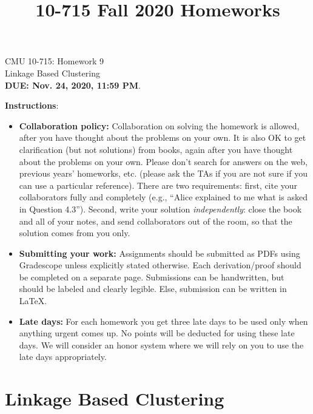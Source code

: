 \documentclass{article}
\title{10-715 Fall 2020 Homeworks}
\begin{document}

\begin{center}
{\Large CMU 10-715: Homework 9}\\
Linkage Based Clustering \\
{\bf DUE: Nov. 24, 2020, 11:59 PM}.\\
\end{center}


\textbf{\large Instructions}:
\begin{itemize}
    \item \textbf{Collaboration policy:} Collaboration on solving the homework is allowed, after you have thought about the problems on your own. It is also OK to get clarification (but not solutions) from books, again after you have thought about the problems on your own. Please don’t search for answers on the web, previous years’ homeworks, etc. (please ask the TAs if you are not sure if you can use a particular reference). There are two requirements: first, cite your collaborators fully and completely (e.g., ``Alice explained to me what is asked in Question 4.3''). Second, write your solution \emph{independently}: close the book and all of your notes, and send collaborators out of the room, so that the solution comes from you only. 
    \item \textbf{Submitting your work:} Assignments should be submitted as PDFs using Gradescope unless explicitly stated otherwise. Each derivation/proof should be completed on a separate page. Submissions can be handwritten, but should be labeled and clearly legible. Else, submission can be written in LaTeX.
    
    \item \textbf{Late days:} For each homework you get three late days to be used only when anything urgent comes up. No points will be deducted for using these late days. We will consider an honor system where we will rely on you to use the late days appropriately.
    

\end{itemize}

\newpage
\section{Linkage Based Clustering}
\end{document}
